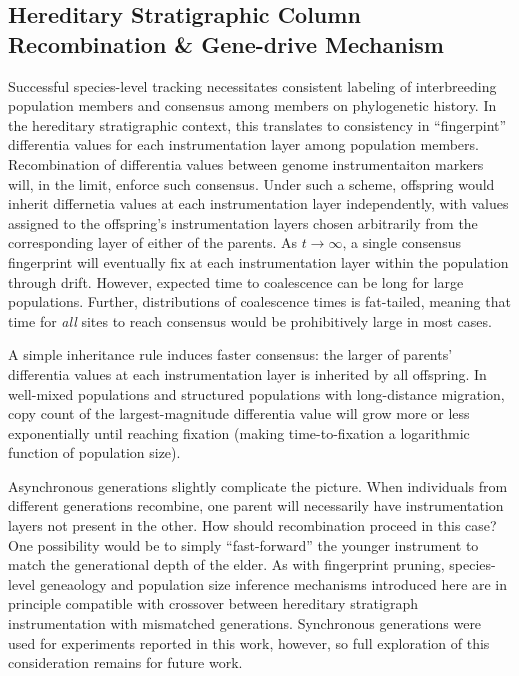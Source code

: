 \subsection{Hereditary Stratigraphic Column Recombination \& Gene-drive Mechanism}
\label{sec:gene-drive}

Successful species-level tracking necessitates consistent labeling of interbreeding population members and consensus among members on phylogenetic history.
In the hereditary stratigraphic context, this translates to consistency in ``fingerpint'' differentia values for each instrumentation layer among population members.
Recombination of differentia values between genome instrumentaiton markers will, in the limit, enforce such consensus.
Under such a scheme, offspring would inherit differnetia values at each instrumentation layer independently, with values assigned to the offspring's instrumentation layers chosen arbitrarily from the corresponding layer of either of the parents.
As $t \to \infty$, a single consensus fingerprint will eventually fix at each instrumentation layer within the population through drift.
However, expected time to coalescence can be long for large populations.
Further, distributions of coalescence times is fat-tailed, meaning that time for \textit{all} sites to reach consensus would be prohibitively large in most cases.

A simple inheritance rule induces faster consensus: the larger of parents' differentia values at each instrumentation layer is inherited by all offspring.
In well-mixed populations and structured populations with long-distance migration, copy count of the largest-magnitude differentia value will grow more or less exponentially until reaching fixation (making time-to-fixation a logarithmic function of population size).

Asynchronous generations slightly complicate the picture.
When individuals from different generations recombine, one parent will necessarily have instrumentation layers not present in the other.
How should recombination proceed in this case?
One possibility would be to simply ``fast-forward'' the younger instrument to match the generational depth of the elder.
As with fingerprint pruning, species-level geneaology and population size inference mechanisms introduced here are in principle compatible with crossover between hereditary stratigraph instrumentation with mismatched generations.
Synchronous generations were used for experiments reported in this work, however, so full exploration of this consideration remains for future work.

